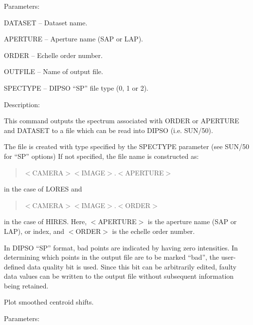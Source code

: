 \begin {description}
\begin {description}
\item Parameters:

\begin {description}
\item DATASET -- Dataset name.
\item APERTURE -- Aperture name (SAP or LAP).
\item ORDER -- Echelle order number.
\item OUTFILE -- Name of output file.
\item SPECTYPE -- DIPSO ``SP'' file type (0, 1 or 2).
\end {description}

\item Description:

This command outputs the spectrum associated with ORDER or APERTURE
and DATASET to a file which can be read into DIPSO (i.e. SUN/50).

The file is created with type specified
by the SPECTYPE parameter (see SUN/50 for ``SP'' options)
If not specified, the file name is constructed as:

\begin {quote}
$<$CAMERA$><$IMAGE$>.<$APERTURE$>$
\end {quote}
in the case of LORES and

\begin {quote}
$<$CAMERA$><$IMAGE$>.<$ORDER$>$
\end {quote}
in the case of HIRES.
Here, $<$APERTURE$>$ is the aperture name (SAP or LAP), or index, and
$<$ORDER$>$ is the echelle order number.

In DIPSO ``SP'' format, bad points are indicated by having zero intensities.
In determining which points in the output file are to be marked
``bad'', the user-defined data quality bit is used.
Since this bit can be arbitrarily edited,
faulty data values can be written to the output file
without subsequent information being retained.
\end {description}

\item [PLCEN]
Plot smoothed centroid shifts.

\begin {description}
\item Parameters:


\end{description}
\end{description}
